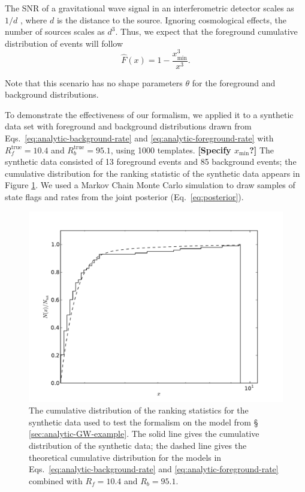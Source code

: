 \documentclass[aps,prd]{revtex4-1}
\newcommand{\xmin}{x_\mathrm{min}}
\newcommand{\ilya}[1]{{\color{red} \bf #1}}
\begin{document}
The SNR of a gravitational wave signal in an interferometric detector
scales as $1/d$ \citep{Finn1992}, where $d$ is the distance to the
source.  Ignoring cosmological effects, the number of sources scales
as $d^3$.  Thus, we expect that the foreground cumulative distribution
of events will follow
\begin{equation}
  \label{eq:analytic-foreground-rate}
  \hat{F}(x) = 1 - \frac{\xmin^3}{x^3}.
\end{equation}

Note that this scenario has no shape parameters $\theta$ for the
foreground and background distributions.

To demonstrate the effectiveness of our formalism, we applied it to a
synthetic data set with foreground and background distributions drawn
from Eqs.~\eqref{eq:analytic-background-rate} and
\eqref{eq:analytic-foreground-rate} with $R_f^\mathrm{true} = 10.4$
and $R_b^\mathrm{true} = 95.1$, using 1000 templates.  \ilya{[Specify
    $\xmin$?]} The synthetic data consisted of 13 foreground events
and 85 background events; the cumulative distribution for the ranking
statistic of the synthetic data appears in Figure
\ref{fig:analytic-data-cumulative}.  We used a Markov Chain Monte
Carlo simulation to draw samples of state flags and rates from the
joint posterior (Eq.~\eqref{eq:posterior}).

\begin{figure}
  \includegraphics[width=\columnwidth]{data}
  \caption{\label{fig:analytic-data-cumulative} The cumulative
    distribution of the ranking statistics for the synthetic data used
    to test the formalism on the model from \S
    \ref{sec:analytic-GW-example}.  The solid line gives the
    cumulative distribution of the synthetic data; the dashed line
    gives the theoretical cumulative distribution for the models in
    Eqs.~\eqref{eq:analytic-background-rate} and
    \eqref{eq:analytic-foreground-rate} combined with $R_f = 10.4$ and
    $R_b = 95.1$.}
\end{figure}
\end{document}
